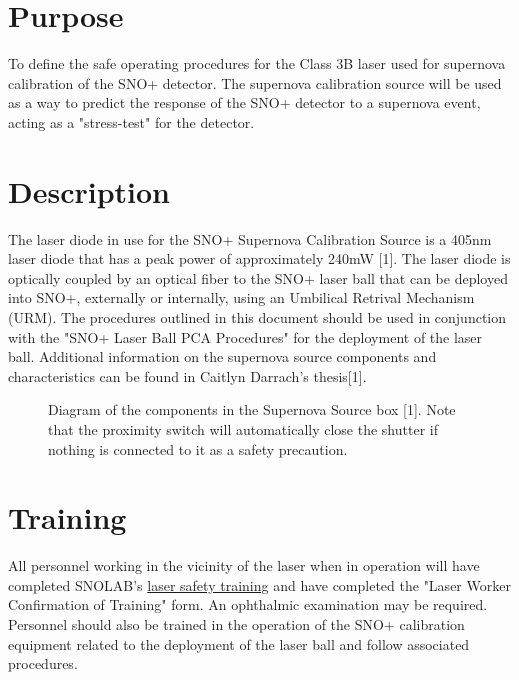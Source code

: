 
\section{Purpose}
To define the safe operating procedures for the Class 3B laser used for supernova calibration of the SNO+ detector. The supernova calibration source will be used as a way to predict the response of the SNO+ detector to a supernova event, acting as a "stress-test" for the detector.

\section{Description}
The laser diode in use for the SNO+ Supernova Calibration Source is a 405nm laser diode that has a peak power of approximately 240mW [1]. The laser diode is optically coupled by an optical fiber to the SNO+ laser ball that can be deployed into SNO+, externally or internally, using an Umbilical Retrival Mechanism (URM). The procedures outlined in this document should be used in conjunction with the "SNO+ Laser Ball PCA Procedures" for the deployment of the laser ball. Additional information on the supernova source components and characteristics can be found in Caitlyn Darrach's thesis[1].  
\begin{figure}[h] 
\vspace{0.5cm}
{}
\captionsetup{justification=centering}
\caption{Diagram of the components in the Supernova Source box [1]. Note that the proximity switch will automatically close the shutter if nothing is connected to it as a safety precaution.} 
\end{figure}
\section{Training}
All personnel working in the vicinity of the laser when in operation will have completed SNOLAB's \href{https://www.snolab.ca/docushare/dsweb/Get/ControlledDocument-264/SL-MCS-EHS-60-020-P-Lasers-and-UV-Irradiation-Devices-Safety-Program_Rev_01.pdf}{laser safety training} and have completed the "Laser Worker Confirmation of Training" form. An ophthalmic examination may be required. \\
Personnel should also be trained in the operation of the SNO+ calibration equipment related to the deployment of the laser ball and follow associated procedures. 

